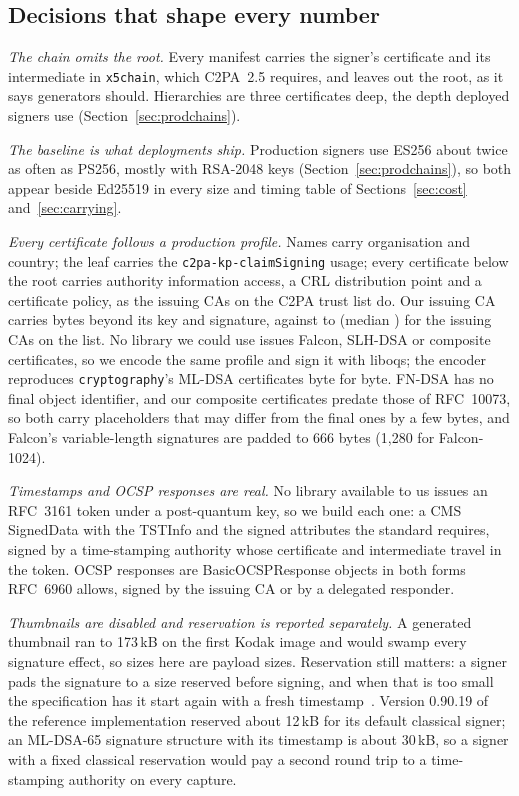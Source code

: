 \subsection{Decisions that shape every number}
\label{sec:method-decisions}

\emph{The chain omits the root.} Every manifest carries the signer's
certificate and its intermediate in \texttt{x5chain}, which C2PA~2.5
requires, and leaves out the root, as it says generators should.
Hierarchies are three certificates deep, the depth deployed signers use
(Section~\ref{sec:prodchains}).

\emph{The baseline is what deployments ship.} Production signers use ES256
about twice as often as PS256, mostly with RSA-2048 keys
(Section~\ref{sec:prodchains}), so both appear beside Ed25519 in every size
and timing table of Sections~\ref{sec:cost} and~\ref{sec:carrying}.

\emph{Every certificate follows a production profile.} Names carry
organisation and country; the leaf carries the \texttt{c2pa-kp-claimSigning}
usage; every certificate below the root carries authority information access,
a CRL distribution point and a certificate policy, as the issuing CAs on the
C2PA trust list do. Our issuing CA carries \Nprofileica{} bytes beyond its key
and signature, against \Nprofilelistlo{} to \Nprofilelisthi{} (median
\Nprofilelistmed) for the issuing CAs on the list. No library we could use
issues Falcon, SLH-DSA or composite certificates, so we encode the same
profile and sign it with liboqs; the encoder reproduces \texttt{cryptography}'s
ML-DSA certificates byte for byte. FN-DSA has no final object identifier, and
our composite certificates predate those of RFC~10073, so both carry
placeholders that may differ from the final ones by a few bytes, and Falcon's variable-length signatures are padded to 666 bytes (1,280
for Falcon-1024).

\emph{Timestamps and OCSP responses are real.} No library available to us
issues an RFC~3161 token under a post-quantum key, so we build each one: a CMS
SignedData with the TSTInfo and the signed attributes the standard requires,
signed by a time-stamping authority whose certificate and intermediate travel
in the token. OCSP responses are BasicOCSPResponse objects in both forms
RFC~6960 allows, signed by the issuing CA or by a delegated responder.

\emph{Thumbnails are disabled and reservation is reported separately.} A
generated thumbnail ran to 173\,kB on the first Kodak image and would swamp
every signature effect, so sizes here are payload sizes. Reservation still
matters: a signer pads the signature to a size reserved before signing, and
when that is too small the specification has it start again with a fresh
timestamp~\cite{c2pacc24}. Version 0.90.19 of the reference implementation
reserved about 12\,kB for its default classical signer; an ML-DSA-65 signature
structure with its timestamp is about 30\,kB, so a signer with a fixed
classical reservation would pay a second round trip to a time-stamping
authority on every capture.

